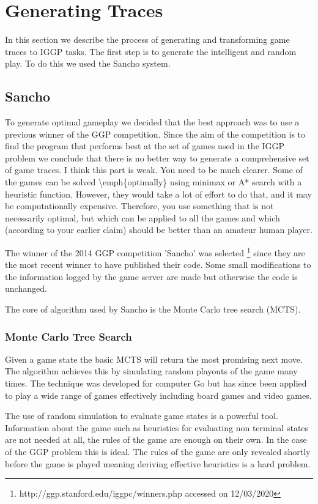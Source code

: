 \chapter{Generating Traces}\label{ch:traces}
In this section we describe the process of generating and transforming game traces to IGGP tasks. The first step is to generate the intelligent and random play. To do this we used the Sancho system\cite{Sancho/Github}.

\section{Sancho}\label{sec:sancho}
To generate optimal gameplay we decided that the best approach was to use a previous winner of the GGP competition. Since the aim of the competition is to find the program that performs best at the set of games used in the IGGP problem we conclude that there is no better way to generate a comprehensive set of game traces.
\ac{
I think this part is weak.
You need to be much clearer.
Some of the games can be solved \emph{optimally} using minimax or A* search with a heuristic function.
However, they would take a lot of effort to do that, and it may be computationally expensive.
Therefore, you use something that is not necessarily optimal, but which can be applied to all the games and which (according to your earlier claim) should be better than an amateur human player.
}

The winner of the 2014 GGP competition 'Sancho' was selected \footnote{http://ggp.stanford.edu/iggpc/winners.php accessed on 12/03/2020} since they are the most recent winner to have published their code\cite{Sancho/Github}. Some small modifications to the information logged by the game server are made but otherwise the code is unchanged.

The core of algorithm used by Sancho is the Monte Carlo tree search (MCTS).

\subsection{Monte Carlo Tree Search}
Given a game state the basic MCTS will return the most promising next move. The algorithm achieves this by simulating random playouts of the game many times. The technique was developed for computer Go but has since been applied to play a wide range of games effectively including board games and video games\cite{Silver/MCTS,Chaslot/MCTS}.

The use of random simulation to evaluate game states is a powerful tool. Information about the game such as heuristics for evaluating non terminal states are not needed at all, the rules of the game are enough on their own. In the case of the GGP problem this is ideal. The rules of the game are only revealed shortly before the game is played meaning deriving effective heuristics is a hard problem.

